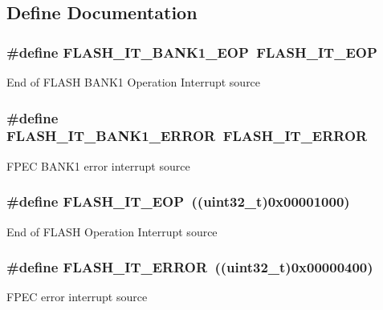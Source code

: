 \subsection{Define Documentation}
\hypertarget{group__FLASH__Interrupts_gac8825e2ce2c0e6ca63a40a347bd351a9}{
\subsubsection[{FLASH\_\-IT\_\-BANK1\_\-EOP}]{\setlength{\rightskip}{0pt plus 5cm}\#define FLASH\_\-IT\_\-BANK1\_\-EOP~FLASH\_\-IT\_\-EOP}}
\label{group__FLASH__Interrupts_gac8825e2ce2c0e6ca63a40a347bd351a9}
End of FLASH BANK1 Operation Interrupt source \hypertarget{group__FLASH__Interrupts_ga808627239be1bf9c2d8bfed36ec4db19}{
\subsubsection[{FLASH\_\-IT\_\-BANK1\_\-ERROR}]{\setlength{\rightskip}{0pt plus 5cm}\#define FLASH\_\-IT\_\-BANK1\_\-ERROR~FLASH\_\-IT\_\-ERROR}}
\label{group__FLASH__Interrupts_ga808627239be1bf9c2d8bfed36ec4db19}
FPEC BANK1 error interrupt source \hypertarget{group__FLASH__Interrupts_gaea20e80e1806d58a7544cfe8659e7f11}{
\subsubsection[{FLASH\_\-IT\_\-EOP}]{\setlength{\rightskip}{0pt plus 5cm}\#define FLASH\_\-IT\_\-EOP~((uint32\_\-t)0x00001000)}}
\label{group__FLASH__Interrupts_gaea20e80e1806d58a7544cfe8659e7f11}
End of FLASH Operation Interrupt source \hypertarget{group__FLASH__Interrupts_ga61c74493d4c1f36ddaf563719d446a7d}{
\subsubsection[{FLASH\_\-IT\_\-ERROR}]{\setlength{\rightskip}{0pt plus 5cm}\#define FLASH\_\-IT\_\-ERROR~((uint32\_\-t)0x00000400)}}
\label{group__FLASH__Interrupts_ga61c74493d4c1f36ddaf563719d446a7d}
FPEC error interrupt source 